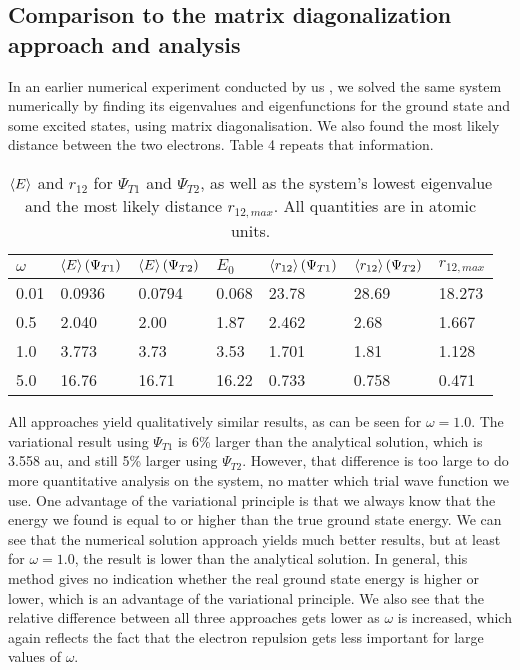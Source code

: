 \documentclass[10pt,a4paper]{article}
\begin{document}
\subsection{Comparison to the matrix diagonalization approach and analysis}
In an earlier numerical experiment conducted by us \cite{Project2}, we solved the same system numerically by finding its eigenvalues and eigenfunctions for the ground state and some excited states, using matrix diagonalisation. We also found the most likely distance between the two electrons. Table 4 repeats that information. 
\begin{table}[H]
\centering
\caption[Energies and distances compared to diagonalisation]{$\braket{E}$ and $r_{12}$ for $\Psi_{T1}$ and $\Psi_{T2}$, as well as the system's lowest eigenvalue and the most likely distance $r_{12,max}$. All quantities are in atomic units.}
\begin{tabular}{|l|l|l|l|l|l|l|}
\hline
$\omega$ & $\braket{E}(\Psi_{T1})$ & $\braket{E}(\Psi_{T2})$ & $E_0$ & $\braket{r_{12}}(\Psi_{T1})$ & $\braket{r_{12}}(\Psi_{T2})$ & $r_{12,max}$ \\ \hline
0.01     & 0.0936                 & 0.0794                  & 0.068 & 23.78                        & 28.69                        & 18.273    \\ \hline
0.5      & 2.040                  & 2.00                    & 1.87  & 2.462                        & 2.68                         & 1.667     \\ \hline
1.0      & 3.773                  & 3.73                    & 3.53  & 1.701                        & 1.81                         & 1.128     \\ \hline
5.0      & 16.76                  & 16.71                   & 16.22 & 0.733                        & 0.758                        & 0.471     \\ \hline
\end{tabular}
\end{table}
All approaches yield qualitatively similar results, as can be seen for $\omega=1.0$. The variational result using $\Psi_{T1}$ is 6\% larger than the analytical solution, which is 3.558 au, and still 5\% larger using $\Psi_{T2}$. However, that difference is too large to do more quantitative analysis on the system, no matter which trial wave function we use.  One advantage of the variational principle is that we always know that the energy we found is equal to or higher than the true ground state energy. We can see that the numerical solution approach yields much better results, but at least for $\omega=1.0$, the result is lower than the analytical solution. In general, this method gives no indication whether the real ground state energy is higher or lower, which is an advantage of the variational principle. We also see that the relative difference between all three approaches gets lower as $\omega$ is increased, which again reflects the fact that the electron repulsion gets less important for large values of $\omega$.\\
\end{document}
